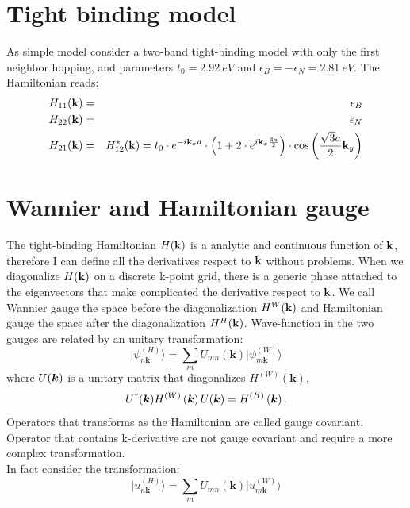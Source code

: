 \documentclass[preprint,showpacs,prb,superscriptaddress,aps,floatfix]{revtex4-1}
\newcommand{\kk}{{\bf k}}
\newcommand{\bea}{\begin{eqnarray}}
\newcommand{\eea}{\end{eqnarray}}
\renewcommand{\[}{\left[}
\renewcommand{\]}{\right]}
\renewcommand{\(}{\left(}
\renewcommand{\)}{\right)}
\def\ket#1{\vert#1\rangle}
\begin{document}
\section{Tight binding model}
As simple model consider a two-band tight-binding model with only the first neighbor hopping, and parameters $t_0=2.92~eV$ and $\epsilon_B = -\epsilon_N = 2.81~eV$. The Hamiltonian reads:
\bea
H_{11}(\kk)&=&\epsilon_B\\
H_{22}(\kk)&=&\epsilon_N\\
H_{21}(\kk)&=&H^*_{12}(\kk) = t_0 \cdot e^{-i \kk_x a}\cdot \left(1+2 \cdot e^{i \kk_x \frac{3 a}{2}} \right)\cdot \cos{ \left( \frac{\sqrt{3} a}{2}\kk_y \right) }
\eea 
\section{Wannier and Hamiltonian gauge}
The tight-binding Hamiltonian $H(\kk)$ is a analytic and continuous function of $\kk$, therefore I can define all the derivatives respect to $\kk$ without problems. When we diagonalize $H(\kk)$ on a discrete k-point grid, there is a generic phase attached to the eigenvectors that make complicated the derivative respect to $\kk$. We call Wannier gauge the space before the diagonalization  $H^{W}(\kk)$ and Hamiltonian gauge the space after the diagonalization $H^{H}(\kk)$. Wave-function in the two gauges are related by an unitary transformation:
\begin{equation}
\ket{\psi_{n\boldsymbol{k}}^{\left(H\right)}}=\sum_{m}U_{mn}\left(\boldsymbol{k}\right)\ket{\psi_{m\boldsymbol{k}}^{\left(W\right)}}
\end{equation}
where $U\text{\ensuremath{\left(\boldsymbol{k}\right)}}$ is a unitary
matrix that diagonalizes $H^{(W)}\left(\boldsymbol{k}\right)$,
\begin{equation}
U^{\dagger}\text{\ensuremath{\left(\boldsymbol{k}\right)}}H^{(W)}\left(\boldsymbol{k}\right)U\text{\ensuremath{\left(\boldsymbol{k}\right)}}=H^{(H)}\left(\boldsymbol{k}\right).
\end{equation}
Operators that transforms as the Hamiltonian are called gauge covariant. Operator that contains k-derivative are not gauge covariant and require a more complex transformation.\\
In fact consider the transformation:
\begin{equation}
\ket{u_{n\boldsymbol{k}}^{\left(H\right)}}=\sum_{m}U_{mn}\left(\boldsymbol{k}\right)\ket{u_{m\boldsymbol{k}}^{\left(W\right)}}
	\label{u_transf}
\end{equation}
\end{document}
